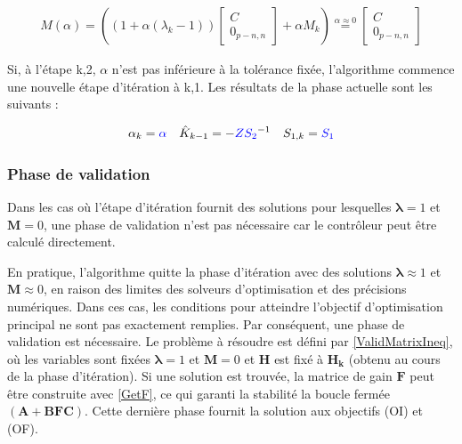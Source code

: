 \begin{equation}
    \begin{gathered}
        \hat{M}(\alpha) = \left((1+\alpha (\lambda_k-1))
        \begin{bmatrix}
            C \\
            0_{p-n,n}
        \end{bmatrix}
        + 
        \alpha M_k\right)
        \stackrel{\alpha \approx 0 }{=}
        \begin{bmatrix}
            C \\
            0_{p-n,n}
        \end{bmatrix}
    \end{gathered}
    \label{Artificiu3}
\end{equation}

Si, à l'étape k,2, $\alpha$ n'est pas inférieure à la tolérance fixée, l'algorithme commence une nouvelle étape d'itération à k,1. Les résultats de la phase actuelle sont les suivants :

\begin{equation}
    \begin{gathered}
\alpha_k=\textcolor{blue}{\alpha}  \quad
        \hat{K}_{k-1} = -\textcolor{blue}{Z} \textcolor{blue}{S_2}^{-1} \quad
        S_{1,k} = \textcolor{blue}{S_1}
    \end{gathered}
    \label{OutputsIterStap1}
\end{equation}

\subsubsection{Phase de validation}
Dans les cas où l'étape d'itération fournit des solutions pour lesquelles $\boldsymbol{\lambda} = 1 $ et $\boldsymbol{M} = 0$, une phase de validation n'est pas nécessaire car le contrôleur peut être calculé directement. 

En pratique, l'algorithme quitte la phase d'itération avec des solutions $\boldsymbol{\lambda} \approx 1$ et $\boldsymbol{M} \approx 0$, en raison des limites des solveurs d'optimisation et des précisions numériques. Dans ces cas, les conditions pour atteindre l'objectif d'optimisation principal ne sont pas exactement remplies. Par conséquent, une phase de validation est nécessaire. Le problème à résoudre est défini par \eqref{ValidMatrixIneq}, où les variables sont fixées $\boldsymbol{\lambda} = 1$ et $\boldsymbol{M} = 0$ et $\boldsymbol{H}$ est fixé à $\boldsymbol{H_k}$ (obtenu au cours de la phase d'itération). Si une solution est trouvée, la matrice de gain $\boldsymbol{F}$ peut être construite avec \eqref{GetF}, ce qui garanti la stabilité la boucle fermée $(\boldsymbol{A}+\boldsymbol{B}\boldsymbol{F}\boldsymbol{C})$. Cette dernière phase fournit la solution aux objectifs (OI) et (OF). 

